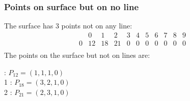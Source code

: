 \documentclass{article}
\begin{document}
{\subsubsection*{Points on surface but on no line}
The surface has 3 points not on any line:\\
$$
\begin{array}{r|*{10}{r}}
 & 0 & 1 & 2 & 3 & 4 & 5 & 6 & 7 & 8 & 9\\
\hline
0 & 12 & 18 & 21 & 0 & 0 & 0 & 0 & 0 & 0 & 0\\
\end{array}
$$
The points on the surface but not on lines are:\\
\begin{multicols}{2}
 : $P_{12}=( 1, 1, 1, 0 )$\\
1 : $P_{18}=( 3, 2, 1, 0 )$\\
2 : $P_{21}=( 2, 3, 1, 0 )$\\
\end{multicols}
}
\end{document}
